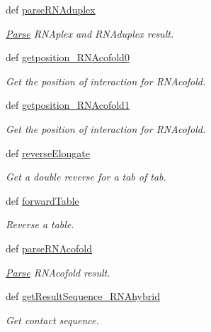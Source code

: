 \begin{DoxyCompactItemize}
def \hyperlink{classirna_1_1iRNA__pred_1_1Parse_1_1Parse_aa3b5c0c0f363279f09f2800c4e57dc02}{parse\-R\-N\-Aduplex}
\begin{DoxyCompactList}\small\item\em \hyperlink{classirna_1_1iRNA__pred_1_1Parse_1_1Parse}{\-Parse} \-R\-N\-Aplex and \-R\-N\-Aduplex result. \end{DoxyCompactList}\item 
def \hyperlink{classirna_1_1iRNA__pred_1_1Parse_1_1Parse_a026765b51a75e5a77d209cd32ec9c2b9}{getposition\-\_\-\-R\-N\-Acofold0}
\begin{DoxyCompactList}\small\item\em \-Get the position of interaction for \-R\-N\-Acofold. \end{DoxyCompactList}\item 
def \hyperlink{classirna_1_1iRNA__pred_1_1Parse_1_1Parse_a7f64baab77885aabf90361d8a1d27f76}{getposition\-\_\-\-R\-N\-Acofold1}
\begin{DoxyCompactList}\small\item\em \-Get the position of interaction for \-R\-N\-Acofold. \end{DoxyCompactList}\item 
def \hyperlink{classirna_1_1iRNA__pred_1_1Parse_1_1Parse_a2ac3072dd4629922ae81e0d054d92b73}{reverse\-Elongate}
\begin{DoxyCompactList}\small\item\em \-Get a double reverse for a tab of tab. \end{DoxyCompactList}\item 
def \hyperlink{classirna_1_1iRNA__pred_1_1Parse_1_1Parse_a6d02507747a9f420240a6cf2a3adcd1d}{forward\-Table}
\begin{DoxyCompactList}\small\item\em \-Reverse a table. \end{DoxyCompactList}\item 
def \hyperlink{classirna_1_1iRNA__pred_1_1Parse_1_1Parse_ac9446ac2de25a7625cc31d7583ae5edc}{parse\-R\-N\-Acofold}
\begin{DoxyCompactList}\small\item\em \hyperlink{classirna_1_1iRNA__pred_1_1Parse_1_1Parse}{\-Parse} \-R\-N\-Acofold result. \end{DoxyCompactList}\item 
def \hyperlink{classirna_1_1iRNA__pred_1_1Parse_1_1Parse_af12767d975c0530c1e07e377d166199d}{get\-Result\-Sequence\-\_\-\-R\-N\-Ahybrid}
\begin{DoxyCompactList}\small\item\em \-Get contact sequence. \end{DoxyCompactList}\item 

\end{DoxyCompactItemize}

